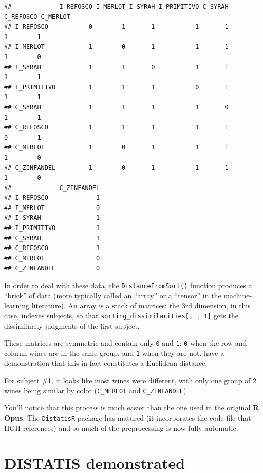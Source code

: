 \documentclass[
]{book}
\begin{document}
\begin{verbatim}
##             I_REFOSCO I_MERLOT I_SYRAH I_PRIMITIVO C_SYRAH C_REFOSCO C_MERLOT
## I_REFOSCO           0        1       1           1       1         1        1
## I_MERLOT            1        0       1           1       1         1        0
## I_SYRAH             1        1       0           1       1         1        1
## I_PRIMITIVO         1        1       1           0       1         1        1
## C_SYRAH             1        1       1           1       0         1        1
## C_REFOSCO           1        1       1           1       1         0        1
## C_MERLOT            1        0       1           1       1         1        0
## C_ZINFANDEL         1        0       1           1       1         1        0
##             C_ZINFANDEL
## I_REFOSCO             1
## I_MERLOT              0
## I_SYRAH               1
## I_PRIMITIVO           1
## C_SYRAH               1
## C_REFOSCO             1
## C_MERLOT              0
## C_ZINFANDEL           0
\end{verbatim}

In order to deal with these data, the \texttt{DistanceFromSort()} function produces a ``brick'' of data (more typically called an ``array'' or a ``tensor'' in the machine-learning literature). An array is a stack of matrices: the 3rd dimension, in this case, indexes subjects, so that \texttt{sorting\_dissimilarities{[},\ ,\ 1{]}} gets the dissimilarity judgments of the first subject.

These matrices are symmetric and contain only \texttt{0} and \texttt{1}: \texttt{0} when the row and column wines are in the same group, and \texttt{1} when they are not. \citet{abdiAnalyzing2007} have a demonstration that this in fact constitutes a Euclidean distance.

For subject \#1, it looks like most wines were different, with only one group of 2 wines being similar by color (\texttt{C\_MERLOT} and \texttt{C\_ZINFANDEL}).

You'll notice that this process is much easier than the one used in the original \textbf{R Opus}. The \texttt{DistatisR} package has matured (it incorporates the code file that HGH references) and so much of the preprocessing is now fully automatic.

\section{DISTATIS demonstrated}\label{distatis-demonstrated}
\end{document}
